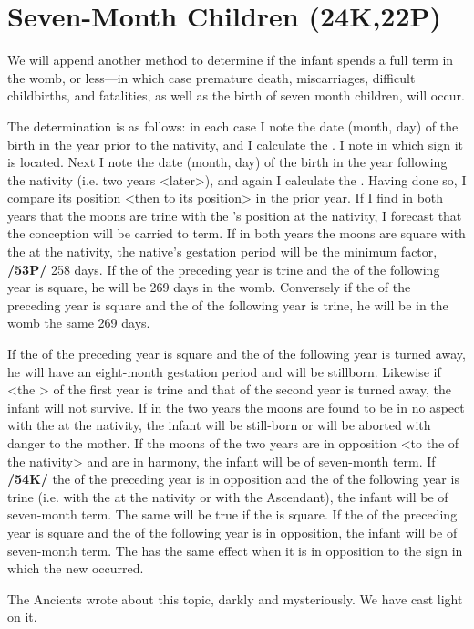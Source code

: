 \section{Seven-Month Children (24K,22P)}
We will append another method to determine if the infant spends a full term in the womb, or less—in which case premature death, miscarriages, difficult childbirths, and fatalities, as well as the birth of seven month children, will occur. 

The determination is as follows: in each case I note the date (month, day) of the birth in the year prior to the nativity, and I calculate the \Moon. I note in which sign it is located.
Next I note the date (month, day) of the birth in the year following the nativity (i.e. two years <later>), and
again I calculate the \Moon. Having done so, I compare its position <then to its position> in the prior year. If I find in both years that the moons are trine with the \Moon’s position at the nativity, I forecast that the conception will be carried to term. If in both years the moons are square with the \Moon\xspace at the nativity, the native’s gestation period will be the minimum factor, \textbf{/53P/} 258 days. If the \Moon\xspace of the preceding year is trine and the \Moon\xspace of the following year is square, he will be 269 days in the womb. Conversely if the \Moon\xspace of the preceding year is square and the \Moon\xspace of the following year is trine, he will be in the womb the same 269 days.

If the \Moon\xspace of the preceding year is square and the \Moon\xspace of the following year is turned away, he will
have an eight-month gestation period and will be stillborn. Likewise if <the \Moon> of the first year is trine and that of the second year is turned away, the infant will not survive. If in the two years the moons are found to be in no aspect with the \Moon\xspace at the nativity, the infant will be still-born or will be aborted with danger to the mother. If the moons of the two years are in opposition <to the \Moon\xspace of the nativity> and are in harmony, the infant will be of seven-month term. If \textbf{/54K/} the \Moon\xspace of the preceding year is in opposition and the \Moon\xspace of the following year is trine (i.e. with the \Moon\xspace at the nativity or with the Ascendant), the infant will be of seven-month term. The same will be true if the \Moon\xspace is square. If the \Moon\xspace of the preceding year is square and the \Moon\xspace of the following year is in opposition, the infant will be of seven-month term. The \Sun\xspace has the same effect when it is in opposition to the sign in which the new \Moon\xspace occurred.

The Ancients wrote about this topic, darkly and mysteriously. We have cast light on it.

\newpage